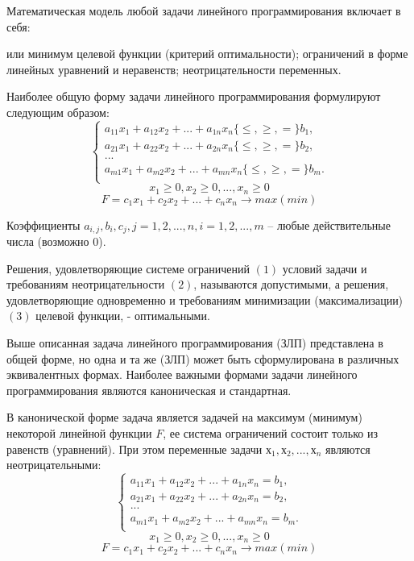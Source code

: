 \documentclass[12pt]{article}
\begin{document}
Математическая модель любой задачи линейного программирования включает в
себя:
\begin{itemize}
 или минимум целевой функции (критерий оптимальности);
 ограничений в форме линейных уравнений и неравенств;
 неотрицательности переменных.
\end{itemize}
\newpage
Наиболее общую форму задачи линейного программирования формулируют следующим образом:
\begin{equation}
 \begin{cases}
  a_{11}x_1 +a_{12}x_2+...+a_{1n}x_n \{\le,\ge,=\}b_1,\\ 
  a_{21}x_1 +a_{22}x_2+...+a_{2n}x_n \{\le,\ge,=\}b_2,\\
  ...\\
  a_{m1}x_1 +a_{m2}x_2+...+a_{mn}x_n \{\le,\ge,=\}b_m.\\
 \end{cases}
\end{equation}
\begin{equation}
x_1\ge0, x_2\ge0, ..., x_n\ge0
\end{equation}
\begin{equation}
F=c_1x_1+c_2x_2 + ... + c_nx_n \rightarrow max(min)
\end{equation}

Коэффициенты $a_{i,j} , b_i , c_j , j = 1, 2, ... , n, i =1, 2, ... , m$ – любые действительные числа
(возможно 0).

Решения, удовлетворяющие системе ограничений $(1)$ условий задачи и
требованиям неотрицательности $(2)$, называются допустимыми, а решения,
удовлетворяющие одновременно и требованиям минимизации (максимализации) $(3)$
целевой функции, - оптимальными.

Выше описанная задача линейного программирования (ЗЛП) представлена в общей
форме, но одна и та же (ЗЛП) может быть сформулирована в различных эквивалентных
формах. Наиболее важными формами задачи линейного программирования являются
каноническая и стандартная.

В канонической форме задача является задачей на максимум (минимум)
некоторой линейной функции $F$, ее система ограничений состоит только из равенств
(уравнений). При этом переменные задачи $х_1, х_2, ..., х_n$ являются неотрицательными:
\begin{equation}
 \begin{cases}
  a_{11}x_1 +a_{12}x_2+...+a_{1n}x_n =b_1,\\ 
  a_{21}x_1 +a_{22}x_2+...+a_{2n}x_n =b_2,\\
  ...\\
  a_{m1}x_1 +a_{m2}x_2+...+a_{mn}x_n=b_m.\\
 \end{cases}
\end{equation}
\begin{equation}
x_1\ge0, x_2\ge0, ..., x_n\ge0
\end{equation}
\begin{equation}
F=c_1x_1+c_2x_2 + ... + c_nx_n \rightarrow max(min)
\end{equation}
\end{document}
